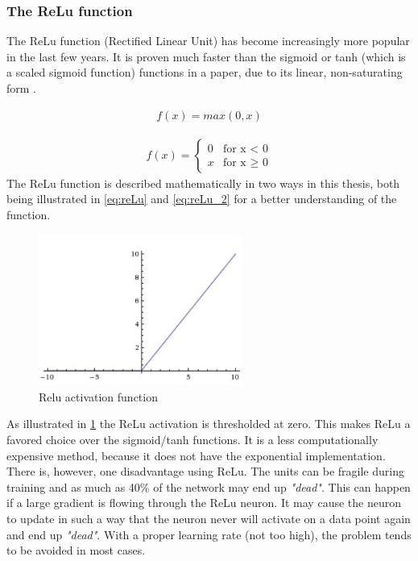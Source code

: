 \documentclass[USenglish]{ifimaster}  %
\begin{document}
\subsubsection{The ReLu function}
The ReLu function (Rectified Linear Unit) has become increasingly more popular in the last few years. It is proven much faster than the sigmoid or tanh (which is a scaled sigmoid function) functions in a paper, due to its linear, non-saturating form \cite{website:relu}. 

\begin{equation}\label{eq:reLu}
\begin{aligned}
f(x) = max(0,x)
\end{aligned}
\end{equation}

\begin{equation}\label{eq:reLu_2}
\begin{aligned}
{f(x) = 
\begin{cases}
    0 & \text{for x < 0}  \\
    x & \text{for x $\geq$ 0}
\end{cases}}
\end{aligned}
\end{equation}
The ReLu function is described mathematically in two ways in this thesis, both being illustrated in \cref{eq:reLu} and \cref{eq:reLu_2} for a better understanding of the function.

\begin{figure}[H]
    \centering
    \includegraphics[width=0.6\textwidth]{bilder/relu_activation.png}
    \caption{Relu activation function \cite{website:cs231n_activation_functions}}
    \label{fig:relu}
\end{figure}
As illustrated in \cref{fig:relu} the ReLu activation is thresholded at zero. This makes ReLu a favored choice over the sigmoid/tanh functions. It is a less computationally expensive method, because it does not have the exponential implementation. There is, however, one disadvantage using ReLu. The units can be fragile during training and as much as 40\% of the network may end up \textit{"dead"}. This can happen if a large gradient is flowing through the ReLu neuron. It may cause the neuron to update in such a way that the neuron never will activate on a data point again and end up \textit{"dead"}. With a proper learning rate (not too high), the problem tends to be avoided in most cases.
\end{document}
